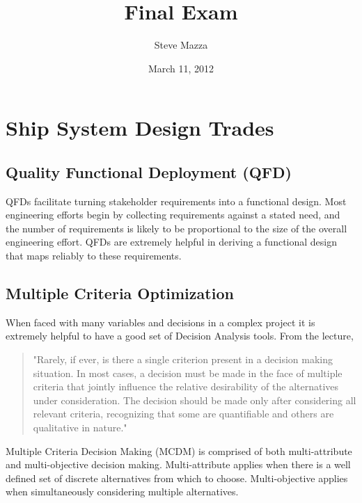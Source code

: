 \documentclass[letterpaper,12pt]{article}
\title{Final Exam}
\author{Steve Mazza}
\date{March 11, 2012}
\begin{document}
\maketitle

\section{Ship System Design Trades}

\subsection{Quality Functional Deployment (QFD)}
QFDs facilitate turning stakeholder requirements into a functional design.  Most engineering efforts begin by collecting requirements against a stated need, and the number of requirements is likely to be proportional to the size of the overall engineering effort. QFDs are extremely helpful in deriving a functional design that maps reliably to these requirements.

\subsection{Multiple Criteria Optimization} 
When faced with many variables and decisions in a complex project it is extremely helpful to have a good set of Decision Analysis tools.  From the lecture,
\begin{quote}"Rarely, if ever, is there a single criterion present in a decision making situation.  In most cases, a decision must be made in the face of multiple criteria that jointly influence the relative desirability of the alternatives under consideration.  The decision should be made only after considering all relevant criteria, recognizing that some are quantifiable and others are qualitative in nature."\end{quote}

Multiple Criteria Decision Making (MCDM) is comprised of both multi-attribute and multi-objective decision making.  Multi-attribute applies when there is a well defined set of discrete alternatives from which to choose.  Multi-objective applies when simultaneously considering multiple alternatives.
\end{document}
